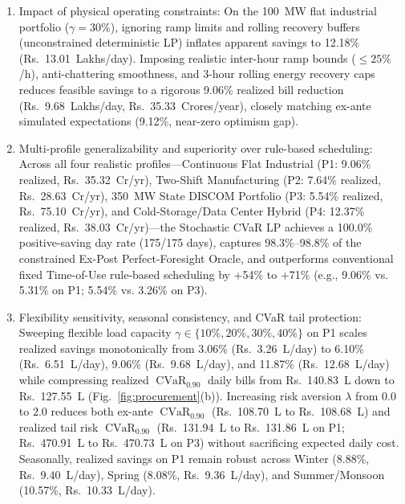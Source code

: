 \documentclass[journal,10pt,twocolumn]{IEEEtran}
\begin{document}
\begin{enumerate}
    \item Impact of physical operating constraints: On the 100~MW flat industrial portfolio ($\gamma = 30\%$), ignoring ramp limits and rolling recovery buffers (unconstrained deterministic LP) inflates apparent savings to 12.18\% (Rs.~13.01~Lakhs/day). Imposing realistic inter-hour ramp bounds ($\le 25\%$/h), anti-chattering smoothness, and 3-hour rolling energy recovery caps reduces feasible savings to a rigorous 9.06\% realized bill reduction (Rs.~9.68~Lakhs/day, Rs.~35.33~Crores/year), closely matching ex-ante simulated expectations (9.12\%, near-zero optimism gap).
    \item Multi-profile generalizability and superiority over rule-based scheduling: Across all four realistic profiles---Continuous Flat Industrial (P1: 9.06\% realized, Rs.~35.32~Cr/yr), Two-Shift Manufacturing (P2: 7.64\% realized, Rs.~28.63~Cr/yr), 350~MW State DISCOM Portfolio (P3: 5.54\% realized, Rs.~75.10~Cr/yr), and Cold-Storage/Data Center Hybrid (P4: 12.37\% realized, Rs.~38.03~Cr/yr)---the Stochastic CVaR LP achieves a 100.0\% positive-saving day rate (175/175 days), captures 98.3\%--98.8\% of the constrained Ex-Post Perfect-Foresight Oracle, and outperforms conventional fixed Time-of-Use rule-based scheduling by +54\% to +71\% (e.g., 9.06\% vs. 5.31\% on P1; 5.54\% vs. 3.26\% on P3).
    \item Flexibility sensitivity, seasonal consistency, and CVaR tail protection: Sweeping flexible load capacity $\gamma \in \{10\%, 20\%, 30\%, 40\%\}$ on P1 scales realized savings monotonically from 3.06\% (Rs.~3.26~L/day) to 6.10\% (Rs.~6.51~L/day), 9.06\% (Rs.~9.68~L/day), and 11.87\% (Rs.~12.68~L/day) while compressing realized $\operatorname{CVaR}_{0.90}$ daily bills from Rs.~140.83~L down to Rs.~127.55~L (Fig.~\ref{fig:procurement}(b)). Increasing risk aversion $\lambda$ from $0.0$ to $2.0$ reduces both ex-ante $\operatorname{CVaR}_{0.90}$ (Rs.~108.70~L to Rs.~108.68~L) and realized tail risk $\operatorname{CVaR}_{0.90}$ (Rs.~131.94~L to Rs.~131.86~L on P1; Rs.~470.91~L to Rs.~470.73~L on P3) without sacrificing expected daily cost. Seasonally, realized savings on P1 remain robust across Winter (8.88\%, Rs.~9.40~L/day), Spring (8.08\%, Rs.~9.36~L/day), and Summer/Monsoon (10.57\%, Rs.~10.33~L/day).
\end{enumerate}
\end{document}
